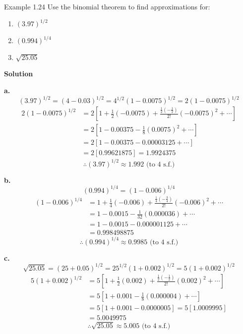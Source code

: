 \begin{example}{Example 1.24}
Use the binomial theorem to find approximations for:
\begin{enumerate}
  \item[a.] $(3.97)^{1/2}$
  \item[b.] $(0.994)^{1/4}$
  \item[c.] $\sqrt{25.05}$
\end{enumerate}

\medskip\noindent\textbf{Solution}

\textbf{a.}
\[
  (3.97)^{1/2} = (4-0.03)^{1/2} = 4^{1/2}(1-0.0075)^{1/2} = 2(1-0.0075)^{1/2}
\]
\begin{align*}
  2(1-0.0075)^{1/2} &= 2\left[1 + \frac{1}{2}(-0.0075) + \frac{\tfrac{1}{2}\left(-\tfrac{1}{2}\right)}{2!}(-0.0075)^2 + \cdots\right] \\
  &= 2\left[1 - 0.00375 - \frac{1}{8}(0.0075)^2 + \cdots\right] \\
  &= 2\left[1 - 0.00375 - 0.00003125 + \cdots\right] \\
  &= 2\left[0.99621875\right] = 1.9924375
\end{align*}
\[
  \therefore (3.97)^{1/2} \approx 1.992 \text{ (to 4 s.f.)}
\]

\textbf{b.}
\[
  (0.994)^{1/4} = (1-0.006)^{1/4}
\]
\begin{align*}
  (1-0.006)^{1/4} &= 1 + \frac{1}{4}(-0.006) + \frac{\tfrac{1}{4}\left(-\tfrac{3}{4}\right)}{2!}(-0.006)^2 + \cdots \\
  &= 1 - 0.0015 - \frac{1}{32}(0.000036) + \cdots \\
  &= 1 - 0.0015 - 0.000001125 + \cdots \\
  &= 0.998498875
\end{align*}
\[
  \therefore (0.994)^{1/4} \approx 0.9985 \text{ (to 4 s.f.)}
\]

\textbf{c.}
\[
  \sqrt{25.05} = (25+0.05)^{1/2} = 25^{1/2}(1+0.002)^{1/2} = 5(1+0.002)^{1/2}
\]
\begin{align*}
  5(1+0.002)^{1/2} &= 5\left[1 + \frac{1}{2}(0.002) + \frac{\tfrac{1}{2}\left(-\tfrac{1}{2}\right)}{2!}(0.002)^2 + \cdots\right] \\
  &= 5\left[1 + 0.001 - \frac{1}{8}(0.000004) + \cdots\right] \\
  &= 5\left[1 + 0.001 - 0.0000005\right] = 5\left[1.0009995\right] \\
  &= 5.0049975
\end{align*}
\[
  \therefore \sqrt{25.05} \approx 5.005 \text{ (to 4 s.f.)}
\]
\end{example}

